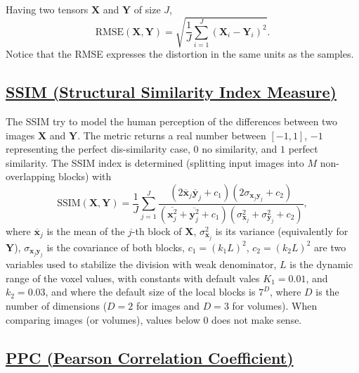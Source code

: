 \documentclass{article}
\begin{document}
Having two tensors $\mathbf{X}$ and $\mathbf{Y}$ of size $J$,
\begin{equation}
  \text{RMSE}(\mathbf{X},\mathbf{Y}) = \sqrt{\frac{1}{J}\sum_{i=1}^J(\mathbf{X}_i - \mathbf{Y}_i)^2}.
\end{equation}
Notice that the RMSE expresses the distortion in the same units as the
samples.


\subsection{\href{https://en.wikipedia.org/wiki/Structural_similarity_index_measure}{SSIM
    (Structural Similarity Index Measure)}}

The SSIM try to model the human perception of the differences between
two images $\mathbf{X}$ and $\mathbf{Y}$. The metric returns a real
number between $[-1, 1]$, $-1$ representing the perfect dis-similarity
case, $0$ no similarity, and $1$ perfect similarity. The SSIM index is
determined (splitting input images into $M$ non-overlapping blocks)
with
\begin{equation}
  \text{SSIM}(\mathbf{X}, \mathbf{Y}) = \frac{1}{J} \sum_{j=1}^J \frac{(2\overline{\mathbf{x}}_j \overline{\mathbf{y}}_j + c_1)(2\sigma_{\mathbf{x}_j \mathbf{y}_j} + c_2)}{(\overline{\mathbf{x}_j^2} + \overline{\mathbf{y}_j^2} + c_1)(\sigma^2_{\mathbf{x}_j} + \sigma^2_{\mathbf{y}_j} + c_2)},
\end{equation}
where $\overline{\mathbf x}_j$ is the mean of the $j$-th block of
$\mathbf{X}$, $\sigma^2_{\mathbf{x}_j}$ is its variance (equivalently
for $\mathbf{Y}$), $\sigma_{\mathbf{x}_j\mathbf{y}_j}$ is the
covariance of both blocks, $c_1=(k_1L)^2$, $c_2=(k_2L)^2$ are two
variables used to stabilize the division with weak denominator, $L$ is
the dynamic range of the voxel values, with constants with default
vales $K_1=0.01$, and $k_2=0.03$, and where the default size of the
local blocks is $7^D$, where $D$ is the number of dimensions ($D=2$
for images and $D=3$ for volumes). When comparing images (or volumes),
values below $0$ does not make sense.


\subsection{\href{https://en.wikipedia.org/wiki/Pearson_correlation_coefficient}{PPC
    (Pearson Correlation Coefficient)}}
\end{document}
